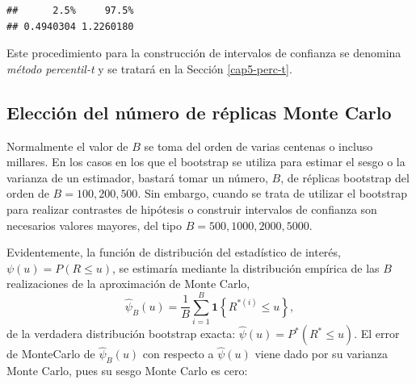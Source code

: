 \documentclass[]{book}
\newenvironment{Shaded}{\begin{snugshade}}{\end{snugshade}}
\newcommand{\KeywordTok}[1]{\textcolor[rgb]{0.13,0.29,0.53}{\textbf{#1}}}
\newcommand{\DecValTok}[1]{\textcolor[rgb]{0.00,0.00,0.81}{#1}}
\newcommand{\StringTok}[1]{\textcolor[rgb]{0.31,0.60,0.02}{#1}}
\newcommand{\CommentTok}[1]{\textcolor[rgb]{0.56,0.35,0.01}{\textit{#1}}}
\newcommand{\OperatorTok}[1]{\textcolor[rgb]{0.81,0.36,0.00}{\textbf{#1}}}
\newcommand{\NormalTok}[1]{#1}
\theoremstyle{definition}
\theoremstyle{definition}
\theoremstyle{definition}
\theoremstyle{remark}
\begin{document}
\begin{Shaded}
\end{Shaded}

\begin{verbatim}
##      2.5%     97.5% 
## 0.4940304 1.2260180
\end{verbatim}

Este procedimiento para la construcción de intervalos de confianza se
denomina \emph{método percentil-t} y se tratará en la Sección
\ref{cap5-perc-t}.

\subsection{Elección del número de réplicas Monte
Carlo}\label{eleccion-del-numero-de-replicas-monte-carlo}

Normalmente el valor de \(B\) se toma del orden de varias centenas o
incluso millares. En los casos en los que el bootstrap se utiliza para
estimar el sesgo o la varianza de un estimador, bastará tomar un número,
\(B\), de réplicas bootstrap del orden de \(B = 100, 200, 500\). Sin
embargo, cuando se trata de utilizar el bootstrap para realizar
contrastes de hipótesis o construir intervalos de confianza son
necesarios valores mayores, del tipo \(B = 500, 1000, 2000, 5000\).

Evidentemente, la función de distribución del estadístico de interés,
\(\psi \left( u \right) =P\left( R\leq u \right)\), se estimaría
mediante la distribución empírica de las \(B\) realizaciones de la
aproximación de Monte Carlo, \[\hat{\psi}_{B}\left( u \right) =
\frac{1}{B}\sum_{i=1}^{B}\mathbf{1}\left\{ R^{\ast (i)}\leq u\right\},\]
de la verdadera distribución bootstrap exacta:
\(\hat{\psi}\left(u \right) =P^{\ast}\left( R^{\ast}\leq u \right)\). El
error de MonteCarlo de \(\hat{\psi}_{B}\left( u \right)\) con respecto a
\(\hat{\psi}\left( u \right)\) viene dado por su varianza Monte Carlo,
pues su sesgo Monte Carlo es cero:
\end{document}
